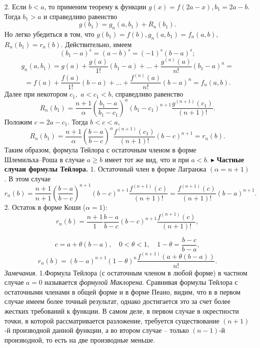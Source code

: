 2. Если $b<a$, то применим теорему к  функции $g(x)=f(2a-x), b_{1}=2a-b.$ Тогда $b_{1}>a$ и справедливо равенство 
$$g(b_{1})=g_{n}(a,b_{1})+R_{n}(b_{1}).$$
Но легко убедиться в том, что $g(b_{1})=f(b), g_{n}(a,b_{1})=f_{n}(a,b)$,
$R_{n}(b_{1})=r_{n}(b)$. Действительно, имеем
$$(b_{1}-a)^s=(a-b)^s=(-1)^s(b-a)^s;$$  
$$g_{n}(a,b_{1})=g(a)+ \dfrac{g(a)}{1!}(b_{1}-a)+ \ldots +\dfrac{g^{(n)}(a)}{n!}(b_{1}-a)^n=$$
$$=f(a)+ \dfrac{f(a)}{1!}(b-a)+ \ldots +\dfrac{f^{(n)}(a)}{n!}(b-a)^n=f_{n}(a,b).$$
Далее при некотором $c_{1},$ $a<c_{1}<b$, справедливо равенство
$$R_{n}(b_{1})=\dfrac{n+1}{\alpha} \left(\dfrac{b_{1}-a}{b_{1}-c_{1}} \right)^{\alpha} (b_{1}-c_{1})^{n+1} \dfrac{g^{(n+1)}(c_{1})}{(n+1)!}.$$
Положим $c=2a-c_{1}$. Тогда $b<c<a$,
$$R_{n}(b_{1})=\dfrac{n+1}{\alpha} \left(\dfrac{b-a}{b-c} \right)^{\alpha} \dfrac{f^{(n+1)}(c_{1})}{(n+1)!}(b-c)^{n+1}=r_{n}(b).$$
Таким образом, формула Тейлора с остаточным членом в форме\\
 Шлемильха--Роша в случае $a \ge b$ имеет тот же вид, что и при $a<b$.
$\blacktriangleright$
{\bfseries Частные случаи формулы Тейлора.}
1. Остаточный член в форме Лагранжа $(\alpha=n+1)$. В этом случае
$$r_{n}(b)=\dfrac{n+1}{n+1} \left(\dfrac{b-a}{b-c} \right)^{n+1} (b-c)^{n+1} \dfrac{f^{(n+1)}(c)}{(n+1)!}=\dfrac{f^{(n+1)}(c)}{(n+1)!}(b-a)^{n+1}.$$
2. Остаток в форме Коши ($\alpha=1$):
$$r_n(b)=\dfrac{n+1}{1}\dfrac{b-a}{b-c}(b-c)^{n+1}\dfrac{f^{(n+1)}(c)}{(n+1)!},$$

$$c=a+\theta(b-a),\quad 0<\theta<1,\quad 1-\theta= \dfrac{b-c}{b-a},$$
$$r_{n}(b)=(b-a)^{n+1}(1-\theta)^n \dfrac{f^{(n+1)}(a+\theta(b-a))}{n!}.$$ 
{\itshape Замечания}. 1.\quad Формула Тейлора (с остаточным членом в любой форме) в частном случае $a=0$ называется {\itshape формулой Маклорена}.
\quad Сравнивая формулы Тейлора с остаточными членами в общей форме и в форме Пеано, видим, что в в первом случае имеем более точный результат, однако достигается это за счет более жестких требований к функции. В самом деле, в первом случае в окрестности точки, в которой рассматривается разложение, требуется существование $(n+1)$-й производной данной функции, а во втором случае -- только $(n-1)$-й производной, то есть на две производные меньше.
























